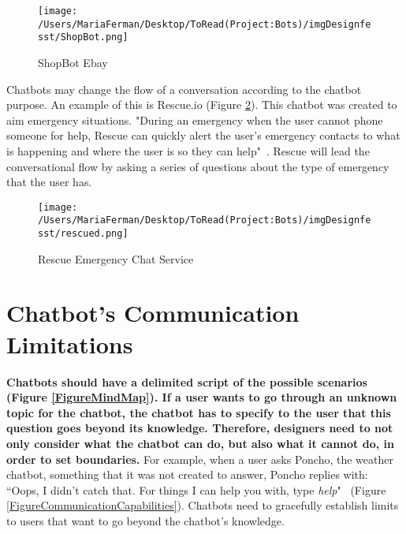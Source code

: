 \documentclass[a4paper,10pt]{article}
\begin{document}
\begin{figure}
\centering
\texttt{[image: /Users/MariaFerman/Desktop/ToRead(Project:Bots)/imgDesignfesst/ShopBot.png]}
\caption{ShopBot Ebay}
\label{FigureEbay}
\end{figure}


Chatbots may change the flow of a conversation according to the chatbot purpose. An example of this is Rescue.io (Figure \ref{FigureRescue}). This chatbot was created to aim emergency situations. "During an emergency when the user cannot phone someone for help, Rescue can quickly alert the user's emergency contacts to what is happening and where the user is so they can help"~\cite{Rescue}. Rescue will lead the conversational flow by asking a series of questions about the type of emergency that the user has. 

\begin{figure}
\centering
\texttt{[image: /Users/MariaFerman/Desktop/ToRead(Project:Bots)/imgDesignfesst/rescued.png]}
\caption{Rescue Emergency Chat Service}
\label{FigureRescue}
\end{figure}


\section{Chatbot's Communication Limitations}

\textbf{Chatbots should have a delimited script of the possible scenarios (Figure \ref{FigureMindMap}). If a user wants to go through an unknown topic for the chatbot, the chatbot has to specify to the user that this question goes beyond its knowledge. Therefore, designers need to not only consider what the chatbot can do, but also what it cannot do, in order to set boundaries.} For example, when a user asks Poncho, the weather chatbot, something that it was not created to answer, Poncho replies with: ``Oops, I didn't catch that. For things I can help you with, type \textit{help}"~\cite{HeuristicsWebPage} (Figure \ref{FigureCommunicationCapabilities}). Chatbots need to gracefully establish limits to users that want to go beyond the chatbot's knowledge.  
\end{document}
